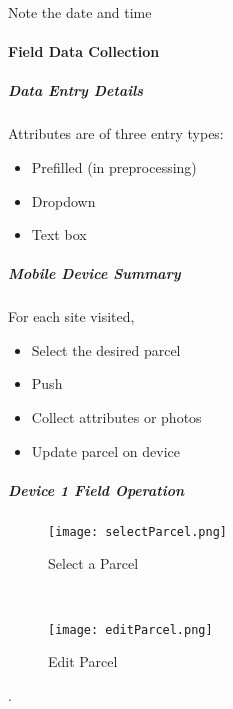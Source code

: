  \vspace{4in}

 {\smallbtn Note the date and time}
 \vspace{1in}


 \clearpage

 \paragraph{Field Data Collection}
 
 \subparagraph{Data Entry Details}

 Attributes are of three entry types:
 \begin{itemize}
 \item Prefilled {\scriptsize (in preprocessing)}
 \item Dropdown
 \item Text box
 \end{itemize}
 \vspace{1in}

 \subparagraph{Mobile Device Summary}

 For each site visited,

 \begin{itemize}
 \item Select the desired parcel
 \item Push 
 \item Collect attributes or photos
 \item Update parcel on device
 \end{itemize}

 \clearpage


 \subparagraph{Device 1 Field Operation}

 \begin{wrapfigure}{r}{0.5\textwidth}
 \centering
     \texttt{[image: selectParcel.png]}
 \vspace{-.1in}
 
 \caption {Select a Parcel}
 \vspace{.1in}

 \HRule \\[.4cm] %
 \vspace{.1in}

 \centering
     \texttt{[image: editParcel.png]}
     \vspace{-.1in}
     
 \caption{Edit Parcel}
 \end{wrapfigure}
 .
 \vspace{2in}

